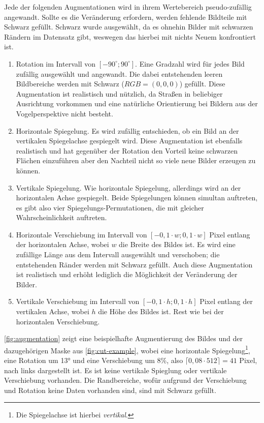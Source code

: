 Jede der folgenden Augmentationen wird in ihrem Wertebereich pseudo-zufällig angewandt. Sollte es die Veränderung 
erfordern, werden fehlende Bildteile mit Schwarz gefüllt. Schwarz wurde ausgewählt, da es ohnehin Bilder mit 
schwarzen Rändern im Datensatz gibt, weswegen das hierbei mit nichts Neuem konfrontiert ist. 
\begin{enumerate}
	\item Rotation im Intervall von $[-90^\circ ; 90^\circ ]$. Eine Gradzahl wird für jedes Bild zufällig ausgewählt und angewandt. 
	Die dabei entstehenden leeren Bildbereiche werden mit Schwarz ($RGB = (0,0,0)$) gefüllt. 
	Diese Augmentation ist realistisch und nützlich, da Straßen in beliebiger Ausrichtung vorkommen und 
	eine natürliche Orientierung bei Bildern aus der Vogelperspektive nicht besteht.
	\item Horizontale Spiegelung. Es wird zufällig entschieden, ob ein Bild an der vertikalen Spiegelachse gespiegelt wird. 
	Diese Augmentation ist ebenfalls realistisch und hat gegenüber der Rotation den Vorteil keine schwarzen Flächen 
	einzuführen aber den Nachteil nicht so viele neue Bilder erzeugen zu können. 
	\item Vertikale Spiegelung. Wie horizontale Spiegelung, allerdings wird an der horizontalen Achse gespiegelt. 
	Beide Spiegelungen können simultan auftreten, es gibt also vier Spiegelungs-Permutationen, 
	die mit gleicher Wahrscheinlichkeit auftreten.
	\item Horizontale Verschiebung im Intervall von $[-0,1 \cdot w; 0,1 \cdot w]$ Pixel entlang der horizontalen Achse,
	wobei $w$ die Breite des Bildes ist. Es wird eine zufällige Länge aus dem Intervall ausgewählt und verschoben; die 
	entstehenden Ränder werden mit Schwarz gefüllt. Auch diese Augmentation ist realistisch und erhöht lediglich 
	die Möglichkeit der Veränderung der Bilder. 
	\item Vertikale Verschiebung im Intervall von $[-0,1 \cdot h; 0,1 \cdot h]$ Pixel entlang der vertikalen Achse,
	wobei $h$ die Höhe des Bildes ist. Rest wie bei der horizontalen Verschiebung.    
\end{enumerate} 

\autoref{fig:augmentation} zeigt eine beispielhafte Augmentierung des Bildes und der dazugehörigen Maske aus \autoref{fig:cut-example},
wobei eine horizontale Spiegelung\footnote{Die Spiegelachse ist hierbei \textit{vertikal}.},
eine Rotation um 13° und eine Verschiebung um 8\%, also $\lceil 0,08 \cdot 512 \rceil = 41$ Pixel, 
nach links dargestellt ist. Es ist keine vertikale Spieglung oder vertikale Verschiebung vorhanden.
Die Randbereiche, wofür aufgrund der Verschiebung und Rotation keine Daten vorhanden sind, sind mit Schwarz gefüllt. 

